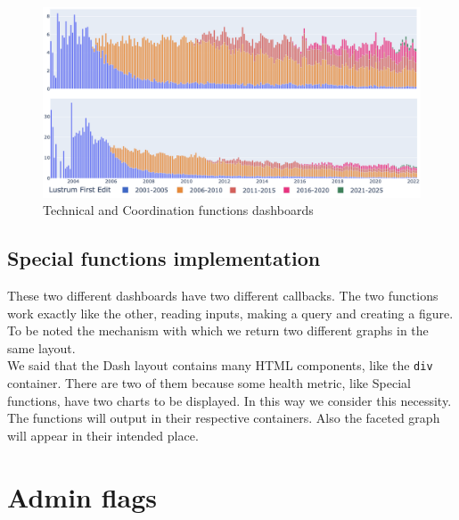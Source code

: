 \begin{figure}[h]
    \centering
    \includegraphics[width=470px]{img/technical_coordinator.png}
    \caption{Technical and Coordination functions dashboards}
    \label{fig:special_functions}
\end{figure}


\subsection{Special functions implementation}
\label{sec:special_functions_callback}

These two different dashboards have two different callbacks. The two functions work exactly like the other, reading inputs, making a query and creating a figure. To be noted the mechanism with which we return two different graphs in the same layout.\\
We said that the Dash layout contains many HTML components, like the \verb#div# container. There are two of them because some health metric, like Special functions, have two charts to be displayed. In this way we consider this necessity. The functions will output in their respective containers. Also the faceted graph will appear in their intended place.

\section{Admin flags}
\label{sec:admin_flags}

